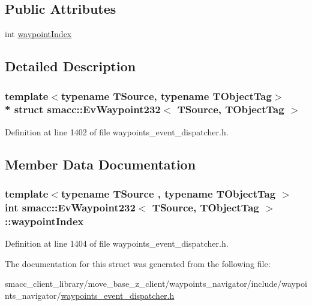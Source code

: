 \subsection*{Public Attributes}
\begin{DoxyCompactItemize}
\item 
int \hyperlink{structsmacc_1_1EvWaypoint232_abb63a8ada16186065a8b9e51cf98b8cc}{waypoint\+Index}
\end{DoxyCompactItemize}


\subsection{Detailed Description}
\subsubsection*{template$<$typename T\+Source, typename T\+Object\+Tag$>$\\*
struct smacc\+::\+Ev\+Waypoint232$<$ T\+Source, T\+Object\+Tag $>$}



Definition at line 1402 of file waypoints\+\_\+event\+\_\+dispatcher.\+h.



\subsection{Member Data Documentation}
\subsubsection[{\texorpdfstring{waypoint\+Index}{waypointIndex}}]{\setlength{\rightskip}{0pt plus 5cm}template$<$typename T\+Source , typename T\+Object\+Tag $>$ int {\bf smacc\+::\+Ev\+Waypoint232}$<$ T\+Source, T\+Object\+Tag $>$\+::waypoint\+Index}\hypertarget{structsmacc_1_1EvWaypoint232_abb63a8ada16186065a8b9e51cf98b8cc}{}\label{structsmacc_1_1EvWaypoint232_abb63a8ada16186065a8b9e51cf98b8cc}


Definition at line 1404 of file waypoints\+\_\+event\+\_\+dispatcher.\+h.



The documentation for this struct was generated from the following file\+:\begin{DoxyCompactItemize}
\item 
smacc\+\_\+client\+\_\+library/move\+\_\+base\+\_\+z\+\_\+client/waypoints\+\_\+navigator/include/waypoints\+\_\+navigator/\hyperlink{waypoints__event__dispatcher_8h}{waypoints\+\_\+event\+\_\+dispatcher.\+h}\end{DoxyCompactItemize}
